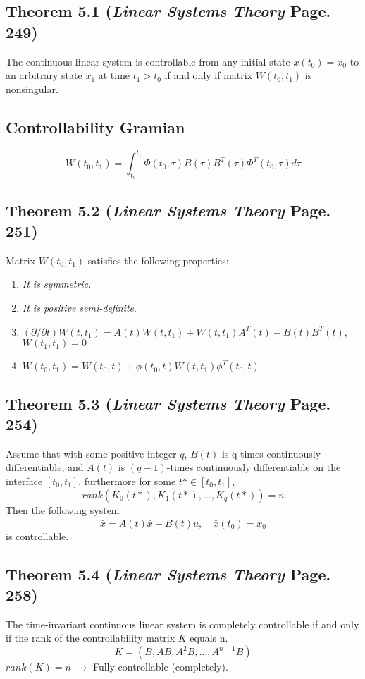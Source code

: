 \documentclass[12pt]{article}
\begin{document}
\subsection*{Theorem 5.1 ({\em Linear Systems Theory} Page. 249)}
The continuous linear system is controllable from any initial state $x(t_0)=x_0$ to an arbitrary state $x_1$ at time $t_1>t_0$ if and only if matrix $W(t_0,t_1)$ is nonsingular.

\subsection*{Controllability Gramian}
$$W(t_0,t_1)=\int_{t_0}^{t_1}\Phi(t_0,\tau)B(\tau)B^T(\tau)\Phi^T(t_0,\tau)d\tau$$

\subsection*{Theorem 5.2 ({\em Linear Systems Theory} Page. 251)}
Matrix $W(t_0,t_1)$ satisfies the following properties:
\renewcommand{\labelenumiii}{\Roman{enumii}}
\begin{enumerate}
  \item {\em It is symmetric.}
  \item {\em It is positive semi-definite}. 
  \item $(\partial/\partial t)W(t,t_1)=A(t)W(t,t_1)+W(t,t_1)A^T(t)-B(t)B^T(t)$, \\$W(t_1,t_1)=0$
  \item $W(t_0,t_1)=W(t_0,t)+\phi(t_0,t)W(t,t_1)\phi^T(t_0,t)$
\end{enumerate}

\subsection*{Theorem 5.3 ({\em Linear Systems Theory} Page. 254)}
Assume that with some positive integer $q$, $B(t)$ is q-times continuously differentiable, and $A(t)$ is $(q-1)$-times continuously differentiable on the interface $[t_0,t_1]$, furthermore for some $t*\in [t_0,t_1]$,
$$rank(K_0(t*),K_1(t*),\dots,K_q(t*))=n$$
Then the following system
$$\dot{\bar{x}}=A(t)\bar{x}+B(t)u,\quad \bar{x}(t_0)=x_0$$
is controllable. 

\subsection*{Theorem 5.4 ({\em Linear Systems Theory} Page. 258)}
The time-invariant continuous linear system is completely controllable if and only if the rank of the controllability matrix $K$ equals n.
$$K=(B,AB,A^2B,\dots,A^{n-1}B)$$
$rank(K)=n$ $\rightarrow$ Fully controllable (completely).
 
\end{document}

